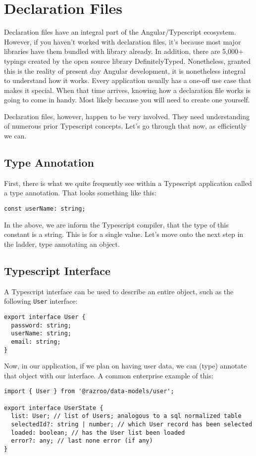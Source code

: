 \chapter{Declaration Files}
Declaration files have an integral part of the Angular/Typescript ecosystem. However, if you haven't worked with declaration files, it's because most major libraries have them bundled with library already. In addition, there are 5,000+ typings created by the open source library DefinitelyTyped. Nonetheless, granted this is the reality of present day Angular development, it is nonetheless integral to understand how it works. Every application usually has a one-off use case that makes it special. When that time arrives, knowing how a declaration file works is going to come in handy. Most likely because you will need to create one yourself.

Declaration files, however, happen to be very involved. They need understanding of numerous prior Typescript concepts. Let's go through that now, as efficiently we can.

\section{Type Annotation}
First, there is what we quite frequently see within a Typescript application called a type annotation. That looks something like this: 

\begin{verbatim}
const userName: string;  
\end{verbatim}

In the above, we are inform the Typescript compiler, that the type of this constant is a string. This is for a single value. Let's move onto the next step in the ladder, type annotating an object.

\section{Typescript Interface}
A Typescript interface can be used to describe an entire object, such as the following \lstinline{User} interface: 
\begin{lstlisting}[caption=Typescript User Interface]
export interface User {
  password: string;
  userName: string;
  email: string;
}
\end{lstlisting}

Now, in our application, if we plan on having user data, we can (type) annotate that object with our interface. A common enterprise example of this: 
\begin{lstlisting}[caption=user.reducer.ts]
import { User } from '@razroo/data-models/user';

export interface UserState {
  list: User; // list of Users; analogous to a sql normalized table
  selectedId?: string | number; // which User record has been selected
  loaded: boolean; // has the User list been loaded
  error?: any; // last none error (if any)
}  
\end{lstlisting}


